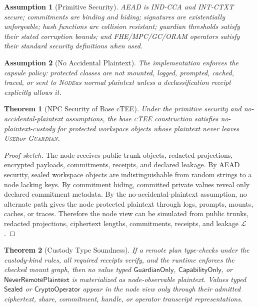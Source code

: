 \documentclass[11pt]{article}
\newtheorem{theorem}{Theorem}
\newtheorem{assumption}{Assumption}
\newcommand{\ctee}{\textnormal{\textsc{cTEE}}}
\newcommand{\roletext}[1]{\textnormal{\textsc{#1}}\xspace}
\newcommand{\node}{\ifmmode\mathsf{Node}\else\roletext{Node}\fi}
\newcommand{\guard}{\ifmmode\mathsf{Guardian}\else\roletext{Guardian}\fi}
\newcommand{\user}{\ifmmode\mathsf{User}\else\roletext{User}\fi}
\newcommand{\leak}{\mathcal{L}}
\begin{document}
\begin{assumption}[Primitive Security]
AEAD is IND-CCA and INT-CTXT secure; commitments are binding and hiding;
signatures are existentially unforgeable; hash functions are collision
resistant; guardian thresholds satisfy their stated corruption bounds; and
FHE/MPC/GC/ORAM operators satisfy their standard security definitions when
used.
\end{assumption}

\begin{assumption}[No Accidental Plaintext]
The implementation enforces the capsule policy: protected classes are not
mounted, logged, prompted, cached, traced, or sent to \node as normal plaintext
unless a declassification receipt explicitly allows it.
\end{assumption}

\begin{theorem}[NPC Security of Base cTEE]
Under the primitive security and no-accidental-plaintext assumptions, the base
\ctee{} construction satisfies no-plaintext-custody for protected workspace
objects whose plaintext never leaves \user or \guard.
\end{theorem}

\begin{proof}[Proof sketch]
The node receives public trunk objects, redacted projections, encrypted
payloads, commitments, receipts, and declared leakage. By AEAD security, sealed
workspace objects are indistinguishable from random strings to a node lacking
keys. By commitment hiding, committed private values reveal only declared
commitment metadata. By the no-accidental-plaintext assumption, no alternate
path gives the node protected plaintext through logs, prompts, mounts, caches,
or traces. Therefore the node view can be simulated from public trunks,
redacted projections, ciphertext lengths, commitments, receipts, and leakage
\(\leak\).
\end{proof}

\begin{theorem}[Custody Type Soundness]
If a remote plan type-checks under the custody-kind rules, all required
receipts verify, and the runtime enforces the checked mount graph, then no value
typed \(\mathsf{GuardianOnly}\), \(\mathsf{CapabilityOnly}\), or
\(\mathsf{NeverRemotePlaintext}\) is materialized as node-observable plaintext.
Values typed \(\mathsf{Sealed}\) or \(\mathsf{CryptoOperator}\) appear in the
node view only through their admitted ciphertext, share, commitment, handle, or
operator transcript representations.
\end{theorem}
\end{document}
